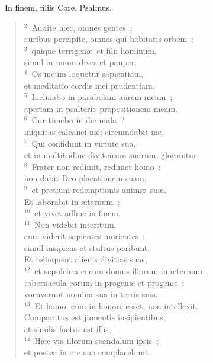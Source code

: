 ~\lettrine[lines=10,image=true,loversize=0.05,lraise=-0.03]{I}{}n finem, filiis Core. Psalmus.
\begin{flushleft}\begin{verse}\vspace{6pt}${}^{2}$~Audite h\ae c, omnes gentes~;\\ auribus percipite, omnes qui habitatis orbem~:\\
${}^{3}$~quique terrigen\ae\ et filii hominum,\\ simul in unum dives et pauper.\\
${}^{4}$~Os meum loquetur sapientiam,\\ et meditatio cordis mei prudentiam.\\
${}^{5}$~Inclinabo in parabolam aurem meam~;\\ aperiam in psalterio propositionem meam.\\
${}^{6}$~Cur timebo in die mala~?\\ iniquitas calcanei mei circumdabit me.\\
${}^{7}$~Qui confidunt in virtute sua,\\ et in multitudine divitiarum suarum, gloriantur.\\
${}^{8}$~Frater non redimit, redimet homo~:\\ non dabit Deo placationem suam,\\
${}^{9}$~et pretium redemptionis anim\ae\ su\ae .\\ Et laborabit in \ae ternum~;\\
${}^{10}$~et vivet adhuc in finem.\\
${}^{11}$~Non videbit interitum,\\ cum viderit sapientes morientes~:\\ simul insipiens et stultus peribunt.\\ Et relinquent alienis divitias suas,\\
${}^{12}$~et sepulchra eorum domus illorum in \ae ternum~;\\ tabernacula eorum in progenie et progenie~:\\ vocaverunt nomina sua in terris suis.\\
${}^{13}$~Et homo, cum in honore esset, non intellexit.\\ Comparatus est jumentis insipientibus,\\ et similis factus est illis.\\
${}^{14}$~H\ae c via illorum scandalum ipsis~;\\ et postea in ore suo complacebunt.\\

\end{verse}
\end{flushleft}
